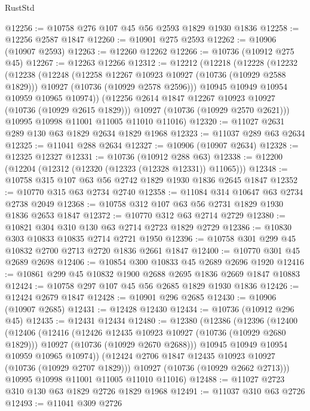 \begin{lexlean}{RustStd}
\begin{coremodule}
@12256 := @10758 @276 @107 @45 @56 @2593 @1829 @1930 @1836
@12258 := @12256 @2587 @1847
@12260 := @10901 @275 @2593
@12262 := @10906 (@10907 @2593)
@12263 := @12260 @12262
@12266 := @10736 (@10912 @275 @45)
@12267 := @12263 @12266
@12312 := @12212
    (@12218
      (@12228
        (@12232
          (@12238
            (@12248
              (@12258 @12267 @10923 @10927 (@10736 (@10929 @2588 @1829)))
              @10927
              (@10736 (@10929 @2578 @2596)))
            @10945
            @10949
            @10954
            @10959
            @10965
            @10974))
        (@12256 @2614 @1847 @12267 @10923 @10927 (@10736 (@10929 @2615 @1829)))
        @10927
        (@10736 (@10929 @2570 @2621)))
      @10995
      @10998
      @11001
      @11005
      @11010
      @11016)
@12320 := @11027 @2631 @289 @130 @63 @1829 @2634 @1829 @1968
@12323 := @11037 @289 @63 @2634
@12325 := @11041 @288 @2634
@12327 := @10906 (@10907 @2634)
@12328 := @12325 @12327
@12331 := @10736 (@10912 @288 @63)
@12338 := @12200 (@12204 (@12312 (@12320 (@12323 (@12328 @12331)) @11065)))
@12348 := @10758 @315 @107 @63 @56 @2742 @1829 @1930 @1836 @2645 @1847
@12352 := @10770 @315 @63 @2734 @2740
@12358 := @11084 @314 @10647 @63 @2734 @2738 @2049
@12368 := @10758 @312 @107 @63 @56 @2731 @1829 @1930 @1836 @2653 @1847
@12372 := @10770 @312 @63 @2714 @2729
@12380 := @10821 @304 @310 @130 @63 @2714 @2723 @1829 @2729
@12386 := @10830 @303 @10833 @10835 @2714 @2721 @1950
@12396 := @10758 @301 @299 @45 @10832 @2700 @2713 @2720 @1836 @2661 @1847
@12400 := @10770 @301 @45 @2689 @2698
@12406 := @10854 @300 @10833 @45 @2689 @2696 @1920
@12416 := @10861 @299 @45 @10832 @1900 @2688 @2695 @1836 @2669 @1847 @10883
@12424 := @10758 @297 @107 @45 @56 @2685 @1829 @1930 @1836
@12426 := @12424 @2679 @1847
@12428 := @10901 @296 @2685
@12430 := @10906 (@10907 @2685)
@12431 := @12428 @12430
@12434 := @10736 (@10912 @296 @45)
@12435 := @12431 @12434
@12480 := @12380
    (@12386
      (@12396
        (@12400
          (@12406
            (@12416
              (@12426 @12435 @10923 @10927 (@10736 (@10929 @2680 @1829)))
              @10927
              (@10736 (@10929 @2670 @2688)))
            @10945
            @10949
            @10954
            @10959
            @10965
            @10974))
        (@12424 @2706 @1847 @12435 @10923 @10927 (@10736 (@10929 @2707 @1829)))
        @10927
        (@10736 (@10929 @2662 @2713)))
      @10995
      @10998
      @11001
      @11005
      @11010
      @11016)
@12488 := @11027 @2723 @310 @130 @63 @1829 @2726 @1829 @1968
@12491 := @11037 @310 @63 @2726
@12493 := @11041 @309 @2726

\end{coremodule}
\end{lexlean}
